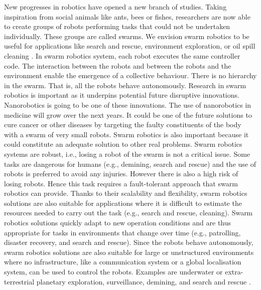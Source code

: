 \documentclass[oneside, a4paper, 12pt]{memoir}
\begin{document}
	New progresses in robotics have opened a new branch of studies. Taking inspiration from social animals like ants, bees or fishes, researchers are now able to create groups of robots performing tasks that could not be undertaken individually. These groups are called swarms. We envision swarm robotics to be useful for applications like search and rescue, environment exploration, or oil spill cleaning \citep{Dorigo:2014}. In swarm robotics system, each robot executes the same controller code. The interaction between the robots and between the robots and the environment enable the emergence of a collective behaviour. There is no hierarchy in the swarm. That is, all the robots behave autonomously. Research in swarm robotics is important as it underpins potential future disruptive innovations. Nanorobotics is going to be one of these innovations. The use of nanorobotics in medicine will grow over the next years. It could be one of the future solutions to cure cancer or other diseases by targeting the faulty constituents of the body with a swarm of very small robots. Swarm robotics is also important because it could constitute an adequate solution to other real problems. Swarm robotics systems are robust, i.e., losing a robot of the swarm is not a critical issue. Some tasks are dangerous for humans (e.g., demining, search and rescue) and the use of robots is preferred to avoid any injuries. However there is also a high risk of losing robots. Hence this task requires a fault-tolerant approach that swarm robotics can provide. Thanks to their scalability and flexibility, swarm robotics solutions are also suitable for applications where it is difficult to estimate the resources needed to carry out the task (e.g., search and rescue, cleaning). Swarm robotics solutions quickly adapt to new operation conditions and are thus appropriate for tasks in environments that change over time (e.g., patrolling, disaster recovery, and search and rescue). Since the robots behave autonomously, swarm robotics solutions are also suitable for large or unstructured environments where no infrastructure, like a communication system or a global localisation system, can be used to control the robots. Examples are underwater or extra-terrestrial planetary exploration, surveillance, demining, and search and rescue \citep{Dorigo:2014}.
	
\end{document}
